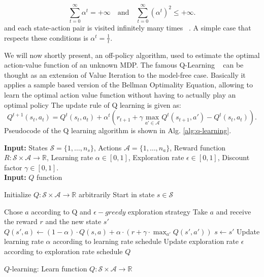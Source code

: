 \begin{equation}
	\sum_{t=0}^{\infty} \alpha^{t}=+\infty \quad \text{and} \quad \sum_{t=0}^{\infty} \left(\alpha^{t}\right)^2 \leq +\infty.
\end{equation}
and  each state-action pair is visited infinitely many times ~\cite{Jaakkola:1994:CSI:1362288.1362296,Sutton:1998:IRL:551283}. A simple case that respects these conditions is $\alpha^t= \frac{1}{t}$.\par
We will now shortly present, an off-policy algorithm, used to estimate the optimal action-value function of an unknown MDP. The famous Q-Learning ~\cite{Watkins:89} can be thought as an extension of Value Iteration to the model-free case. Basically it applies a sample based version of the Bellman Optimality Equation, allowing to learn the optimal action value function without having to actually play an optimal policy The update rule of Q learning is given as:
\begin{equation}
	Q^{t+1}(s_t,a_t)= Q^{t}(s_t,a_t) +\alpha^t \left(r_{t+1} + \gamma \max_{a' \in \mathcal{A}} Q^{t}(s_{t+1},a') - Q^{t}(s_t,a_t)\right).
\end{equation}
Pseudocode of the Q learning algorithm is shown in Alg. \ref{alg:q-learning}.
\begin{algorithm}[H]
\begin{flushleft}
        \textbf{Input:} States $\mathcal{S} = \{1, \dots, n_s\}$, Actions $\mathcal{A} = \{1, \dots, n_a\}$, Reward function $R: \mathcal{S} \times \mathcal{A} \rightarrow \mathbb{R}$, Learning rate $\alpha \in [0, 1]$, Exploration rate $\epsilon \in [0, 1]$, Discount factor $\gamma \in [0, 1]$.\\
        \textbf{Input:} $Q$ function
\end{flushleft}
        \begin{algorithmic}
            \State Initialize $Q: \mathcal{S} \times \mathcal{A} \rightarrow \mathbb{R}$ arbitrarily
                \State Start in state $s \in \mathcal{S}$
                    
                    \State Chose $a$ according to Q and  $\epsilon-greedy $ exploration strategy 
                    \State Take $a$ and receive the reward $r$ and the new state $s'$
                    \State $Q(s', a) \gets (1 - \alpha) \cdot Q(s, a) + \alpha \cdot (r + \gamma \cdot \max_{a'} Q(s', a'))$
                    \State $s \gets s'$
                    \State Update learning rate $\alpha$ according to learning rate schedule
                    \State Update exploration rate $\epsilon$ according to exploration rate schedule
                \EndWhile
            \EndWhile
            \Return $Q$
        \end{algorithmic}
    \caption{$Q$-learning: Learn function $Q: \mathcal{S} \times \mathcal{A} \rightarrow \mathbb{R}$}
    \label{alg:q-learning}
\end{algorithm}
